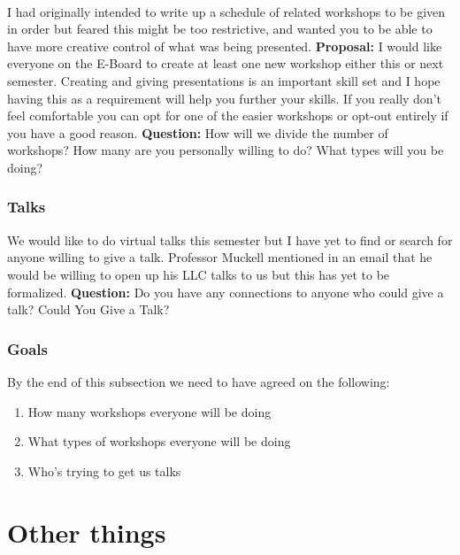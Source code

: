 \documentclass{article}
\begin{document}
\paragraph{}
I had originally intended to write up a schedule of related workshops to be given in order but feared this might be too restrictive, and wanted you to be able to have more creative control of what was being presented.
\vspace{2mm}\newline
\textbf{Proposal:} I would like everyone on the E-Board to create at least one new workshop either this or next semester. Creating and giving presentations is an important skill set and I hope having this as a requirement will help you further your skills. If you really don't feel comfortable you can opt for one of the easier workshops or opt-out entirely if you have a good reason.
\vspace{2mm}\newline
\textbf{Question:} How will we divide the number of workshops? How many are you personally willing to do? What types will you be doing? 





\subsubsection{Talks}

We would like to do virtual talks this semester but I have yet to find or search for anyone willing to give a talk. Professor Muckell mentioned in an email that he would be willing to open up his LLC talks to us but this has yet to be formalized.
\vspace{2mm}\newline
\textbf{Question:} Do you have any connections to anyone who could give a talk? Could You Give a Talk?

\subsubsection{Goals}
By the end of this subsection we need to have agreed on the following:
\begin{enumerate}
    \item How many workshops everyone will be doing
    \item What types of workshops everyone will be doing
    \item Who's trying to get us talks
\end{enumerate}
\section{Other things}
\end{document}
